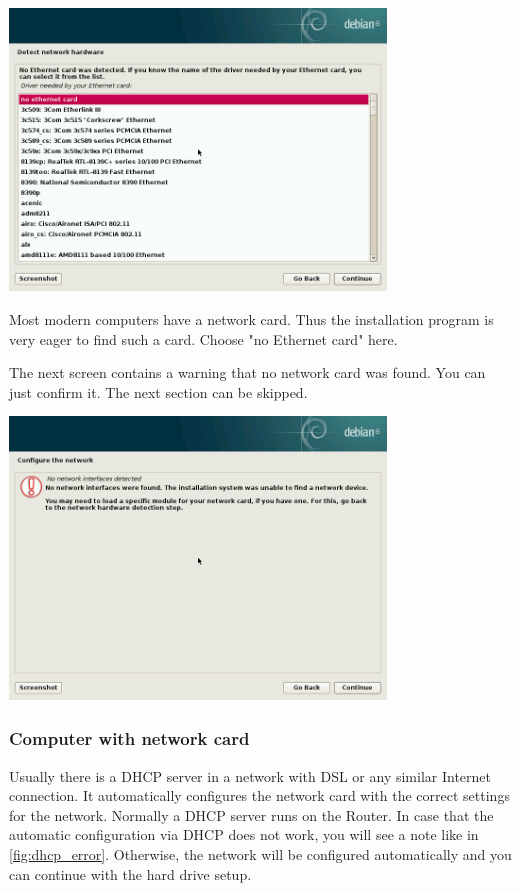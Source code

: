 \documentclass[a4paper,12pt,twoside]{article}
\begin{document}
\begin{minipage}{\linewidth}
  \centering
  \captionsetup{type=figure}
  \includegraphics[width=10cm]{screenshots/select_network_card.png}
  \label{fig:inst_netzwerkkarte}
\end{minipage}
\bigskip

Most modern computers have a network card. Thus the installation program
is very eager to find such a card. Choose "no Ethernet card" here.

The next screen contains a warning that no network card was found. You can
just confirm it. The next section can be skipped.

\bigskip
\begin{minipage}{\linewidth}
  \centering
  \captionsetup{type=figure}
  \includegraphics[width=10cm]{screenshots/message_no_network.png}
  \label{fig:inst_conf_net}
\end{minipage}


\subsubsection{Computer with network card}
\label{sct:inst_with_net}
Usually there is a DHCP server in a network with DSL or any similar
Internet connection. It automatically configures the network card with
the correct settings for the network. Normally a DHCP server runs on
the Router. In case that the automatic configuration via DHCP does not
work, you will see a note like in \ref{fig:dhcp_error}. Otherwise, the
network will be configured automatically and you can continue with the
hard drive setup.
\end{document}
